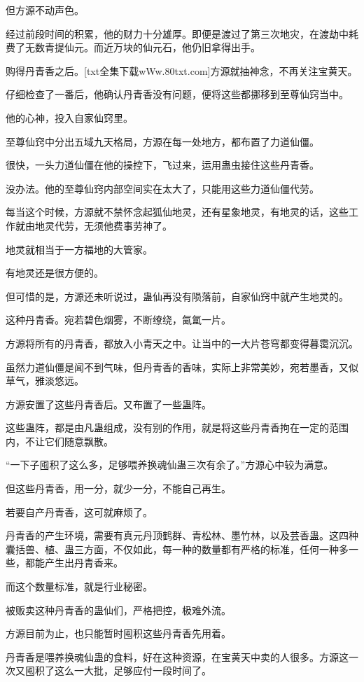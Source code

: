 \begin{this_body}
但方源不动声色。

经过前段时间的积累，他的财力十分雄厚。即便是渡过了第三次地灾，在渡劫中耗费了无数青提仙元。而近万块的仙元石，他仍旧拿得出手。

购得丹青香之后。[txt全集下载wWw.80txt.com]方源就抽神念，不再关注宝黄天。

仔细检查了一番后，他确认丹青香没有问题，便将这些都挪移到至尊仙窍当中。

他的心神，投入自家仙窍里。

至尊仙窍中分出五域九天格局，方源在每一处地方，都布置了力道仙僵。

很快，一头力道仙僵在他的操控下，飞过来，运用蛊虫接住这些丹青香。

没办法。他的至尊仙窍内部空间实在太大了，只能用这些力道仙僵代劳。

每当这个时候，方源就不禁怀念起狐仙地灵，还有星象地灵，有地灵的话，这些工作就由地灵代劳，无须他费事劳神了。

地灵就相当于一方福地的大管家。

有地灵还是很方便的。

但可惜的是，方源还未听说过，蛊仙再没有陨落前，自家仙窍中就产生地灵的。

这种丹青香。宛若碧色烟雾，不断缭绕，氤氲一片。

方源将所有的丹青香，都放入小青天之中。让当中的一大片苍穹都变得暮霭沉沉。

虽然力道仙僵是闻不到气味，但丹青香的香味，实际上非常美妙，宛若墨香，又似草气，雅淡悠远。

方源安置了这些丹青香后。又布置了一些蛊阵。

这些蛊阵，都是由凡蛊组成，没有别的作用，就是将这些丹青香拘在一定的范围内，不让它们随意飘散。

“一下子囤积了这么多，足够喂养换魂仙蛊三次有余了。”方源心中较为满意。

但这些丹青香，用一分，就少一分，不能自己再生。

若要自产丹青香，这可就麻烦了。

丹青香的产生环境，需要有真元丹顶鹤群、青松林、墨竹林，以及芸香蛊。这四种囊括兽、植、蛊三方面，不仅如此，每一种的数量都有严格的标准，任何一种多一些，都能产生出丹青香来。

而这个数量标准，就是行业秘密。

被贩卖这种丹青香的蛊仙们，严格把控，极难外流。

方源目前为止，也只能暂时囤积这些丹青香先用着。

丹青香是喂养换魂仙蛊的食料，好在这种资源，在宝黄天中卖的人很多。方源这一次又囤积了这么一大批，足够应付一段时间了。


\end{this_body}
